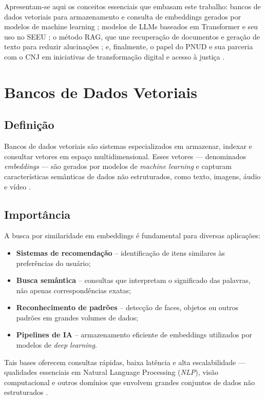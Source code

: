 Apresentam-se aqui os conceitos essenciais que embasam este trabalho: bancos de dados vetoriais para armazenamento e consulta de embeddings gerados por modelos de machine learning \cite{qwak2024integrating}; modelos de LLMs baseados em Transformer e seu uso no SEEU \cite{lewis2020rag,gao2023survey}; o método RAG, que une recuperação de documentos e geração de texto para reduzir alucinações \cite{edwards2024hybrid}; e, finalmente, o papel do PNUD e sua parceria com o CNJ em iniciativas de transformação digital e acesso à justiça \cite{undp2025sobre,undp2025pnudcnj}.

\section{Bancos de Dados Vetoriais}
\label{sec:bancos-vetoriais}

\subsection{Definição}
Bancos de dados vetoriais são sistemas especializados em armazenar, indexar e
consultar vetores em espaço multidimensional. Esses vetores — denominados
\emph{embeddings} — são gerados por modelos de \emph{machine learning} e
capturam características semânticas de dados não estruturados, como texto,
imagens, áudio e vídeo \cite{qwak2024integrating}.

\subsection{Importância}
A busca por similaridade em embeddings é fundamental para diversas
aplicações:
\begin{itemize}
  \item \textbf{Sistemas de recomendação} – identificação de itens similares às preferências do usuário;
  \item \textbf{Busca semântica} – consultas que interpretam o significado das palavras, não apenas correspondências exatas;
  \item \textbf{Reconhecimento de padrões} – detecção de faces, objetos ou outros padrões em grandes volumes de dados;
  \item \textbf{Pipelines de IA} – armazenamento eficiente de embeddings utilizados por modelos de \emph{deep learning}.
\end{itemize}
Tais bases oferecem consultas rápidas, baixa latência e alta escalabilidade —
qualidades essenciais em Natural Language Processing (\emph{NLP}), visão computacional e outros domínios que
envolvem grandes conjuntos de dados não estruturados
\cite{qwak2024integrating}.

